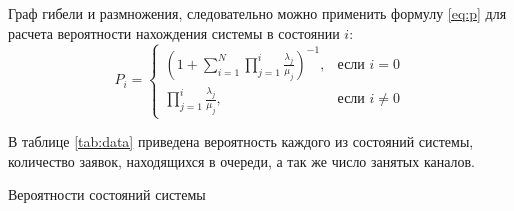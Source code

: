 Граф гибели и размножения, следовательно можно применить формулу \ref{eq:p} для расчета вероятности нахождения системы в состоянии $i$:
\begin{equation}
\label{eq:p}
P_i = \begin{cases}
\left( 1 + \sum \limits_{i=1}^{N} \prod \limits_{j=1}^{i} \frac{\lambda_j}{\mu_j} \right)^{-1} , &\text{если } i = 0 \\
\prod \limits_{j=1}^{i} \frac{\lambda_j}{\mu_j}, &\text{если } i \neq 0
\end{cases}
\end{equation}

В таблице \ref{tab:data} приведена вероятность каждого из состояний системы, количество заявок, находящихся в очереди, а так же число занятых каналов.
\begin{table}[H]
	\centering
	\def\arraystretch{1.1}
	\def\tabcolsep{25pt}
	\caption{Вероятности состояний системы}
	\label{tab:data}
\end{table}

